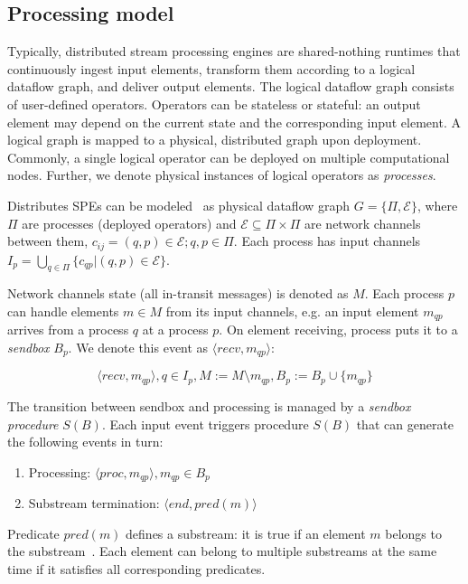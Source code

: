 \label{fs-acker-preliminaries}

\subsection{Processing model}

Typically, distributed stream processing engines are shared-nothing runtimes that continuously ingest input elements, transform them according to a logical dataflow graph, and deliver output elements. The logical dataflow graph consists of user-defined operators. Operators can be stateless or stateful: an output element may depend on the current state and the corresponding input element. A logical graph is mapped to a physical, distributed graph upon deployment. Commonly, a single logical operator can be deployed on multiple computational nodes. Further, we denote physical instances of logical operators as {\em processes}.

Distributes SPEs can be modeled~\cite{carbone2018scalable} as physical dataflow graph $G=\{\Pi,\mathcal{E}\}$, where $\Pi$ are processes (deployed operators) and $\mathcal{E} \subseteq \Pi \times \Pi$ are network channels between them, $c_{ij}=(q,p)\in \mathcal{E}; q,p \in \Pi$. Each process has input channels $I_p = \bigcup_{q \in \Pi} \{c_{qp} | (q,p) \in \mathcal{E}\}$.

Network channels state (all in-transit messages) is denoted as $M$. Each process $p$ can handle elements $m\in M$ from its input channels, e.g. an input element $m_{qp}$ arrives from a process $q$ at a process $p$. On element receiving, process puts it to a {\em sendbox} $B_p$. We denote this event as $\langle recv,m_{qp}\rangle$:

$$\langle recv,m_{qp}\rangle, q\in I_p, M:=M\setminus{m_{qp}}, B_p:=B_p\cup\{m_{qp}\}$$

The transition between sendbox and processing is managed by a {\em sendbox procedure} $S(B)$. Each input event triggers procedure $S(B)$ that can generate the following events in turn:

\begin{enumerate}
    \item Processing: $\langle proc,m_{qp}\rangle, m_{qp}\in B_p$
    \item Substream termination: $\langle end,pred(m)\rangle$
\end{enumerate}

Predicate $pred(m)$ defines a substream: it is true if an element $m$ belongs to the substream~\cite{Tucker:2003:EPS:776752.776780}. Each element can belong to multiple substreams at the same time if it satisfies all corresponding predicates. 

